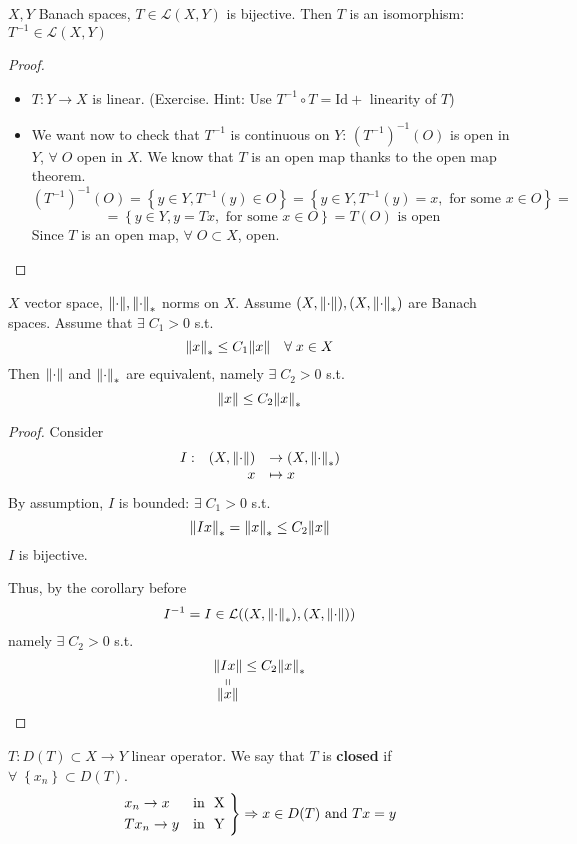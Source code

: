 \begin{corollary}
    \(X,Y\) Banach spaces, \(T \in \mathcal{L}(X,Y)\) is bijective. Then \(T\) is an isomorphism: \(T^{-1} \in \mathcal{L}(X,Y)\)
\end{corollary}
\begin{proof}
    \begin{itemize}
        \item \(T : Y \to X\) is linear. (Exercise. Hint: Use \(T^{-1} \circ T = \text{Id} + \) linearity of \(T\))
        \item We want now to check that \(T^{-1}\) is continuous on \(Y\): \((T^{-1})^{-1}(O)\) is open in \(Y\), \(\forall \; O\) open in \(X\). We know that \(T\) is an open map thanks to the open map theorem.
        \[
            (T^{-1})^{-1}(O) = \left\{ y \in Y, T^{-1}(y) \in O \right\} = \left\{ y \in Y, T^{-1}(y) = x, \mbox{ for some } x \in O \right\} =
        \]
        \[
            = \left\{ y \in Y, y = Tx, \mbox{ for some } x \in O\right\} = T(O) \mbox{ is open}
        \]
    Since \(T\) is an open map, \(\forall \; O \subset X\), open.
    \end{itemize}
\end{proof}
\begin{corollary}
    \(X\) vector space, \(\normdot, \normdot_*\) norms on \(X\). Assume \((X, \normdot), (X, \normdot_*)\) are Banach spaces. 
    Assume that \(\exists \; C_1 > 0\) s.t. 
    \[
        \norm{x}_* \leq C_1\norm{x} \quad \forall \; x \in X
    \]
    Then \(\normdot\) and \(\normdot_*\) are equivalent, namely \(\exists \; C_2 > 0\) s.t. 
    \[
        \norm{x} \leq C_2 \norm{x}_*
    \]
\end{corollary}
\begin{proof}
    Consider
    \[
        \begin{array}{lrl}
            I :& (X, \normdot) & \to (X, \normdot_*) \\
            &x & \mapsto x
        \end{array}
    \]
    By assumption, \(I\) is bounded: \(\exists \; C_1 > 0\) s.t. 
    \[
        \norm{Ix}_* = \norm{x}_* \leq C_2 \norm{x}
    \]
    \(I\) is bijective.

    Thus, by the corollary before
    \[
        I^{-1} = I \in \mathcal{L}((X, \normdot_*), (X, \normdot))
    \]
    namely \(\exists \; C_2 > 0\) s.t. 
    \[
        \stackbelow{\norm{Ix}}{\norm{x}} \leq C_2 \norm{x}_*
    \]
\end{proof}
\begin{definition}
    \(T : D(T) \subset X \to Y\) linear operator. We say that \(T\) is \textbf{closed} if \(\forall \; \left\{ x_n \right\} \subset D(T)\). 
    \[
        \begin{rcases*}
            x_n \to x & \mbox{in } X \\
            Tx_n \to y & \mbox{in } Y
        \end{rcases*} \Rightarrow x \in D(T) \mbox{ and } Tx = y
    \]

\end{definition}
